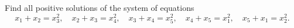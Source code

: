 Find all positive solutions of the system of equations
\[ x_1 + x_2 = x_3^2,\quad x_2 + x_3 = x_4^2,\quad x_3 + x_4 = x_5^2,\quad x_4 + x_5 = x_1^2,\quad x_5 + x_1 = x_2^2. \]
